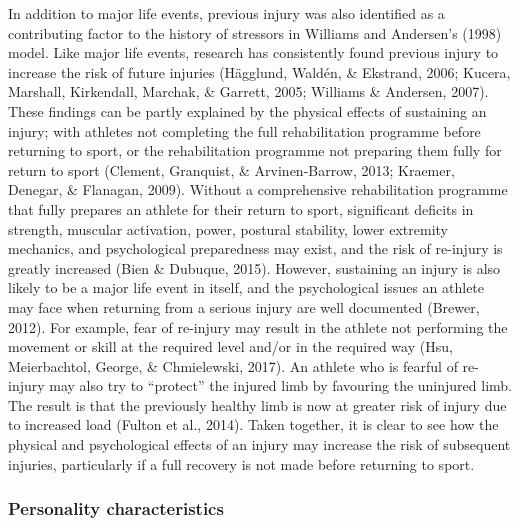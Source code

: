 \documentclass[
  english,
  man,floatsintext]{apa6}
\begin{document}
In addition to major life events, previous injury was also identified as a contributing factor to the history of stressors in Williams and Andersen's (1998) model.
Like major life events, research has consistently found previous injury to increase the risk of future injuries (Hägglund, Waldén, \& Ekstrand, 2006; Kucera, Marshall, Kirkendall, Marchak, \& Garrett, 2005; Williams \& Andersen, 2007).
These findings can be partly explained by the physical effects of sustaining an injury; with athletes not completing the full rehabilitation programme before returning to sport, or the rehabilitation programme not preparing them fully for return to sport (Clement, Granquist, \& Arvinen-Barrow, 2013; Kraemer, Denegar, \& Flanagan, 2009).
Without a comprehensive rehabilitation programme that fully prepares an athlete for their return to sport, significant deficits in strength, muscular activation, power, postural stability, lower extremity mechanics, and psychological preparedness may exist, and the risk of re-injury is greatly increased (Bien \& Dubuque, 2015).
However, sustaining an injury is also likely to be a major life event in itself, and the psychological issues an athlete may face when returning from a serious injury are well documented (Brewer, 2012).
For example, fear of re-injury may result in the athlete not performing the movement or skill at the required level and/or in the required way (Hsu, Meierbachtol, George, \& Chmielewski, 2017).
An athlete who is fearful of re-injury may also try to \enquote{protect} the injured limb by favouring the uninjured limb.
The result is that the previously healthy limb is now at greater risk of injury due to increased load (Fulton et al., 2014).
Taken together, it is clear to see how the physical and psychological effects of an injury may increase the risk of subsequent injuries, particularly if a full recovery is not made before returning to sport.

\hypertarget{personality-characteristics}{%
\subsubsection{Personality characteristics}\label{personality-characteristics}}
\end{document}
